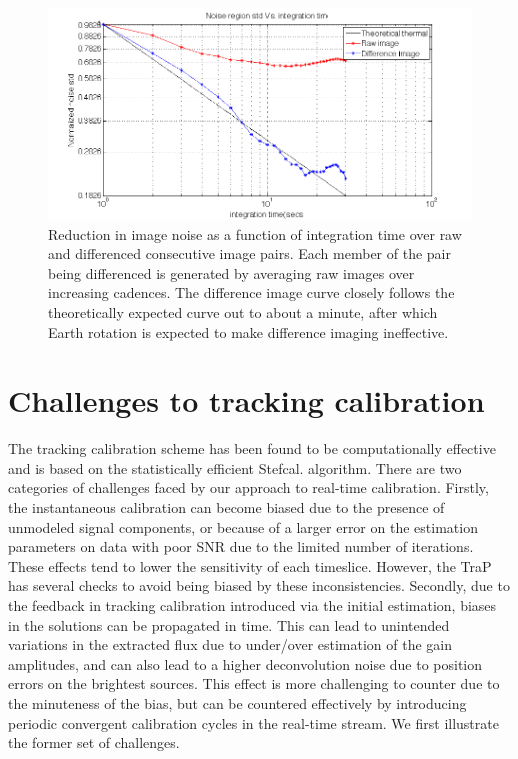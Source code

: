 \documentclass{aa}
\begin{document}
\begin{figure}[tbh]
\includegraphics[width=0.9\paperwidth]{Figs/raw_vs_diff_vs_theory}

\caption{\label{fig:Reduction-in-image}Reduction in image noise as a function of
  integration  time over  raw  and differenced  consecutive  image pairs.   Each
  member of the pair being differenced is generated by averaging raw images over
  increasing  cadences.   The  difference   image  curve  closely   follows  the
  theoretically expected curve out to about a minute, after which Earth rotation
  is expected to make difference imaging ineffective.}
\end{figure}



\section{\label{sec:Challenges-to-tracking}Challenges to tracking calibration}

The tracking calibration  scheme has been found to  be computationally effective
and is based  on the statistically efficient Stefcal.  algorithm.  There are two
categories    of   challenges    faced    by   our    approach   to    real-time
calibration. Firstly, the instantaneous calibration can become biased due to the
presence of  unmodeled signal components,  or because of  a larger error  on the
estimation  parameters on  data  with poor  SNR  due to  the  limited number  of
iterations.   These   effects   tend   to   lower  the   sensitivity   of   each
timeslice. However, the  TraP has several checks to avoid  being biased by these
inconsistencies.  Secondly,   due  to  the  feedback   in  tracking  calibration
introduced via the initial estimation, biases in the solutions can be propagated
in time.  This can lead  to unintended variations  in the extracted flux  due to
under/over estimation  of the  gain amplitudes,  and can also  lead to  a higher
deconvolution noise due to position errors on the brightest sources. This effect
is more  challenging to counter due  to the minuteness  of the bias, but  can be
countered effectively  by introducing periodic convergent  calibration cycles in
the real-time stream. We first illustrate the former set of challenges.
\end{document}
